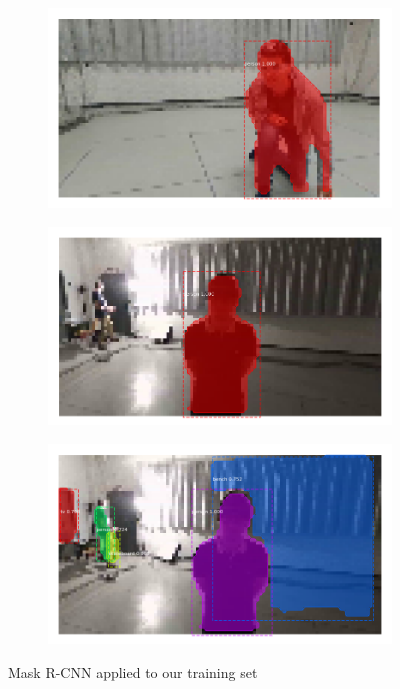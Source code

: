\begin{figure}[!h]
\begin{center}
\begin{subfigure}[h]{0.32\textwidth}
		\end{subfigure}
		\vfill
		\begin{subfigure}[h]{0.32\textwidth}
			\centering
			\includegraphics[width=1\textwidth]{"contents/images/04-maskrcnn-train-4"}
		\end{subfigure}
		\begin{subfigure}[h]{0.32\textwidth}
			\centering
			\includegraphics[width=1\textwidth]{"contents/images/04-maskrcnn-train-5"}
		\end{subfigure}
		\begin{subfigure}[h]{0.32\textwidth}
			\centering
			\includegraphics[width=1\textwidth]{"contents/images/04-maskrcnn-train-6"}
		\end{subfigure}
	\end{center}
	\vspace{-0.5cm}
	\caption[Mask R-CNN applied to our training set]{Mask R-CNN applied to our training set}
	\label{fig:maskrcnn-dario}
\end{figure}

